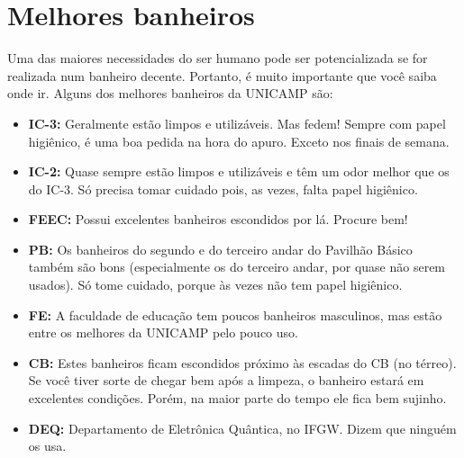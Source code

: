 \documentclass[a4paper,10pt]{article}
\begin{document}
\section{Melhores banheiros}
Uma das maiores necessidades do ser humano pode ser potencializada se for
realizada num banheiro decente. Portanto, é muito importante que você saiba onde
ir. Alguns dos melhores banheiros da UNICAMP são:

\begin{itemize}
\item  \textbf{IC-3:} Geralmente estão limpos e utilizáveis. Mas fedem! Sempre com papel higiênico, é uma boa pedida na hora do apuro. Exceto nos finais de semana.
\end{itemize}

\begin{itemize}
\item  \textbf{IC-2:} Quase sempre estão limpos e utilizáveis e têm um odor melhor que os do IC-3. Só precisa tomar cuidado pois, as vezes, falta papel higiênico.
\end{itemize}

\begin{itemize}
\item  \textbf{FEEC:} Possui excelentes banheiros escondidos por lá. Procure bem!
\end{itemize}

\begin{itemize}
\item  \textbf{PB:} Os banheiros do segundo e do terceiro andar do Pavilhão Básico também são bons (especialmente os do terceiro andar, por quase não serem usados). Só tome cuidado, porque às vezes não tem papel higiênico.
\end{itemize}

\begin{itemize}
\item  \textbf{FE:} A faculdade de educação tem poucos banheiros masculinos, mas estão entre os melhores da UNICAMP pelo pouco uso.
\end{itemize}

\begin{itemize}
\item  \textbf{CB:} Estes banheiros ficam escondidos próximo às escadas do CB (no térreo). Se você tiver sorte de chegar bem após a limpeza, o banheiro estará em excelentes condições. Porém, na maior parte do tempo ele fica bem sujinho.
\end{itemize}

\begin{itemize}
\item  \textbf{DEQ:} Departamento de Eletrônica Quântica, no IFGW. Dizem que ninguém os usa.
\end{itemize}
\end{document}
